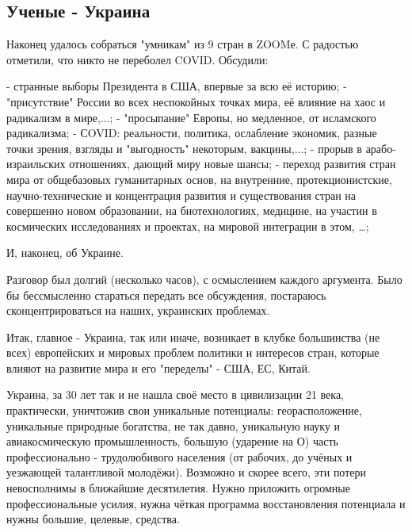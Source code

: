  
 
 

\subsection{Ученые - Украина}

Наконец удалось собраться "умникам" из 9 стран в ZOOMе. 
С радостью отметили, что никто не переболел COVID.
Обсудили:

- странные выборы Президента в США, впервые за всю её историю;
-"присутствие" России во всех неспокойных точках мира, её влияние на хаос и радикализм в мире,...;
- "просыпание" Европы, но медленное, от исламского радикализма;
- СOVID: реальности, политика, ослабление экономик, разные точки зрения, взгляды и "выгодность" некоторым, вакцины,...;
- прорыв в арабо-израильских отношениях, дающий миру новые шансы;
- переход развития стран мира от общебазовых гуманитарных основ, на внутренние,
протекционистские, научно-технические и концентрация развития и  существования
стран на совершенно новом образовании, на биотехнологиях, медицине, на участии
в космических исследованиях и проектах, на мировой интеграции в этом, …;

И, наконец, об Украине.

Разговор был долгий (несколько часов), с осмыслением каждого аргумента. Было бы
бессмысленно стараться передать все обсуждения, постараюсь сконцентрироваться
на наших, украинских проблемах.

Итак, главное - Украина, так или иначе, возникает в клубке большинства (не
всех) европейских и мировых проблем политики и интересов стран, которые влияют
на развитие мира и его "переделы" - США, ЕС, Китай.

Украина, за 30 лет так и не нашла своё место в цивилизации 21 века,
практически, уничтожив свои уникальные потенциалы: георасположение, уникальные
природные богатства, не так давно, уникальную науку и авиакосмическую
промышленность, большую (ударение на О) часть профессионально - трудолюбивого
населения (от рабочих, до учёных и уезжающей талантливой молодёжи).  Возможно и
скорее всего, эти потери невосполнимы в ближайшие десятилетия. Нужно приложить
огромные профессиональные усилия, нужна чёткая программа восстановления
потенциала и нужны большие, целевые, средства.

